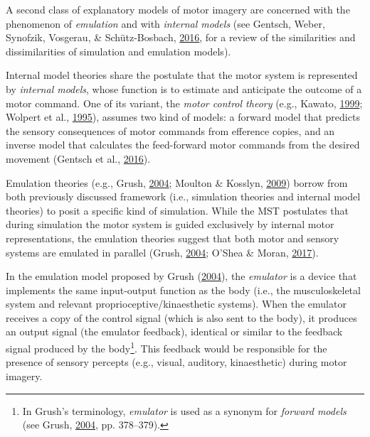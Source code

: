\documentclass[a4paper,12pt,twoside,openright,oldfontcommands]{memoir}
\let\rmarkdownfootnote\footnote%
\def\footnote{\protect\rmarkdownfootnote}
\begin{document}
A second class of explanatory models of motor imagery are concerned with
the phenomenon of \emph{emulation} and with \emph{internal models} (see
Gentsch, Weber, Synofzik, Vosgerau, \& Schütz-Bosbach,
\protect\hyperlink{ref-gentsch_towards_2016}{2016}, for a review of the
similarities and dissimilarities of simulation and emulation models).

Internal model theories share the postulate that the motor system is
represented by \emph{internal models}, whose function is to estimate and
anticipate the outcome of a motor command. One of its variant, the
\emph{motor control theory} (e.g., Kawato,
\protect\hyperlink{ref-kawato_internal_1999}{1999}; Wolpert et al.,
\protect\hyperlink{ref-wolpert_internal_1995}{1995}), assumes two kind
of models: a forward model that predicts the sensory consequences of
motor commands from efference copies, and an inverse model that
calculates the feed-forward motor commands from the desired movement
(Gentsch et al., \protect\hyperlink{ref-gentsch_towards_2016}{2016}).

Emulation theories (e.g., Grush,
\protect\hyperlink{ref-grush_emulation_2004}{2004}; Moulton \& Kosslyn,
\protect\hyperlink{ref-moulton_imagining_2009}{2009}) borrow from both
previously discussed framework (i.e., simulation theories and internal
model theories) to posit a specific kind of simulation. While the MST
postulates that during simulation the motor system is guided exclusively
by internal motor representations, the emulation theories suggest that
both motor and sensory systems are emulated in parallel (Grush,
\protect\hyperlink{ref-grush_emulation_2004}{2004}; O'Shea \& Moran,
\protect\hyperlink{ref-oshea_does_2017}{2017}).

In the emulation model proposed by Grush
(\protect\hyperlink{ref-grush_emulation_2004}{2004}), the
\emph{emulator} is a device that implements the same input-output
function as the body (i.e., the musculoskeletal system and relevant
proprioceptive/kinaesthetic systems). When the emulator receives a copy
of the control signal (which is also sent to the body), it produces an
output signal (the emulator feedback), identical or similar to the
feedback signal produced by the body\footnote{In Grush's terminology,
  \emph{emulator} is used as a synonym for \emph{forward models} (see
  Grush, \protect\hyperlink{ref-grush_emulation_2004}{2004}, pp.
  378--379).}. This feedback would be responsible for the presence of
sensory percepts (e.g., visual, auditory, kinaesthetic) during motor
imagery.
\end{document}
